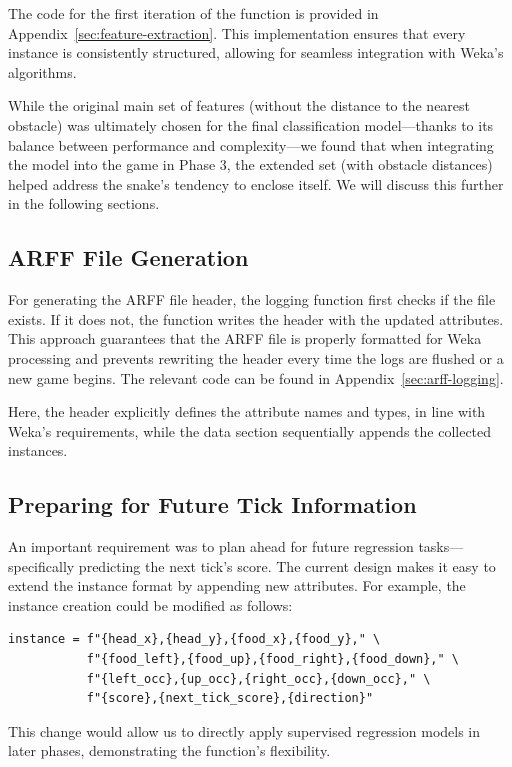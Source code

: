 \documentclass[12pt,a4paper]{article}
\begin{document}
The code for the first iteration of the function is provided in Appendix~\autoref{sec:feature-extraction}. This implementation ensures that every instance is consistently structured, allowing for seamless integration with Weka’s algorithms.

While the original main set of features (without the distance to the nearest obstacle) was ultimately chosen for the final classification model—thanks to its balance between performance and complexity—we found that when integrating the model into the game in Phase 3, the extended set (with obstacle distances) helped address the snake's tendency to enclose itself. We will discuss this further in the following sections.

\subsection{ARFF File Generation}

For generating the ARFF file header, the logging function first checks if the file exists. If it does not, the function writes the header with the updated attributes. This approach guarantees that the ARFF file is properly formatted for Weka processing and prevents rewriting the header every time the logs are flushed or a new game begins. The relevant code can be found in Appendix~\autoref{sec:arff-logging}.

Here, the header explicitly defines the attribute names and types, in line with Weka’s requirements, while the data section sequentially appends the collected instances.

\subsection{Preparing for Future Tick Information}

An important requirement was to plan ahead for future regression tasks—specifically predicting the next tick’s score. The current design makes it easy to extend the instance format by appending new attributes. For example, the instance creation could be modified as follows:

\begin{verbatim}
instance = f"{head_x},{head_y},{food_x},{food_y}," \
           f"{food_left},{food_up},{food_right},{food_down}," \
           f"{left_occ},{up_occ},{right_occ},{down_occ}," \
           f"{score},{next_tick_score},{direction}"
\end{verbatim}

This change would allow us to directly apply supervised regression models in later phases, demonstrating the function’s flexibility.
\end{document}
